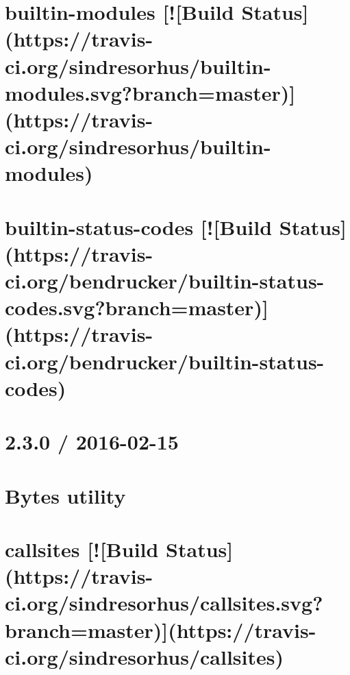 \documentclass[twoside]{book}
\newcommand{\+}{\discretionary{\mbox{\scriptsize$\hookleftarrow$}}{}{}}
\begin{document}
\chapter{builtin-\/modules \mbox{[}!\mbox{[}Build Status\mbox{]}(https\+://travis-\/ci.org/sindresorhus/builtin-\/modules.svg?branch=master)\mbox{]}(https\+://travis-\/ci.org/sindresorhus/builtin-\/modules)}
\label{md__c_1_workspace_demo_src_main_script_node_modules_builtin-modules_readme}

\chapter{builtin-\/status-\/codes \mbox{[}!\mbox{[}Build Status\mbox{]}(https\+://travis-\/ci.org/bendrucker/builtin-\/status-\/codes.svg?branch=master)\mbox{]}(https\+://travis-\/ci.org/bendrucker/builtin-\/status-\/codes)}
\label{md__c_1_workspace_demo_src_main_script_node_modules_builtin-status-codes_readme}

\chapter{2.3.0 / 2016-\/02-\/15}
\label{md__c_1_workspace_demo_src_main_script_node_modules_bytes__history}

\chapter{Bytes utility}
\label{md__c_1_workspace_demo_src_main_script_node_modules_bytes__readme}

\chapter{callsites \mbox{[}!\mbox{[}Build Status\mbox{]}(https\+://travis-\/ci.org/sindresorhus/callsites.svg?branch=master)\mbox{]}(https\+://travis-\/ci.org/sindresorhus/callsites)}
\label{md__c_1_workspace_demo_src_main_script_node_modules_caller-path_node_modules_callsites_readme}

\end{document}
